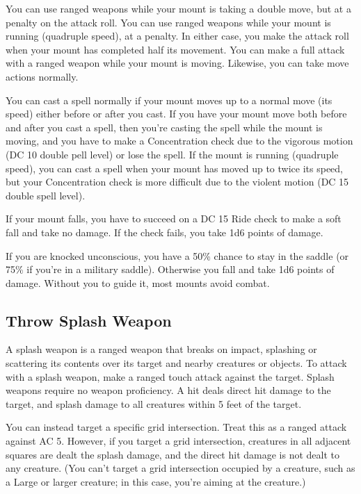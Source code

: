 You can use ranged weapons while your mount is taking a double move, but at a  penalty on the attack roll. You can use ranged weapons while your mount is running (quadruple speed), at a  penalty. In either case, you make the attack roll when your mount has completed half its movement. You can make a full attack with a ranged weapon while your mount is moving. Likewise, you can take move actions normally.

 You can cast a spell normally if your mount moves up to a normal move (its speed) either before or after you cast. If you have your mount move both before and after you cast a spell, then you're casting the spell while the mount is moving, and you have to make a Concentration check due to the vigorous motion (DC 10 \add double pell level) or lose the spell. If the mount is running (quadruple speed), you can cast a spell when your mount has moved up to twice its speed, but your Concentration check is more difficult due to the violent motion (DC 15 \add double spell level).

 If your mount falls, you have to succeed on a DC 15 Ride check to make a soft fall and take no damage. If the check fails, you take 1d6 points of damage.

 If you are knocked unconscious, you have a 50\% chance to stay in the saddle (or 75\% if you're in a military saddle). Otherwise you fall and take 1d6 points of damage. Without you to guide it, most mounts avoid combat.

\subsection{Throw Splash Weapon}
A splash weapon is a ranged weapon that breaks on impact, splashing or scattering its contents over its target and nearby creatures or objects. To attack with a splash weapon, make a ranged touch attack against the target. Splash weapons require no weapon proficiency. A hit deals direct hit damage to the target, and splash damage to all creatures within 5 feet of the target.

You can instead target a specific grid intersection. Treat this as a ranged attack against AC 5. However, if you target a grid intersection, creatures in all adjacent squares are dealt the splash damage, and the direct hit damage is not dealt to any creature. (You can't target a grid intersection occupied by a creature, such as a Large or larger creature; in this case, you're aiming at the creature.)

